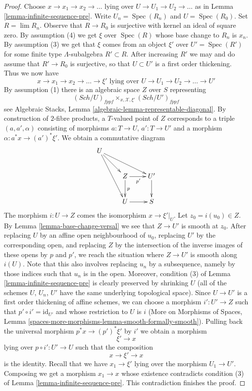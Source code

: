 \documentclass{stacks-project}
\theoremstyle{plain}
\theoremstyle{definition}
\theoremstyle{remark}
\numberwithin{equation}{subsection}
\def\lim{\mathop{\mathrm{lim}}\nolimits}
\def\Spec{\mathop{\mathrm{Spec}}}
\def\Sch{\mathit{Sch}}
\begin{document}
\begin{proof}
\medskip\noindent
Choose $x \to x_1 \to x_2 \to \ldots$ lying over
$U \to U_1 \to U_2 \to \ldots$ as in Lemma \ref{lemma-infinite-sequence-pre}.
Write $U_n = \Spec(R_n)$ and $U = \Spec(R_0)$.
Set $R = \lim R_n$. Observe that $R \to R_0$ is surjective
with kernel an ideal of square zero. By assumption (4)
we get $\xi$ over $\Spec(R)$ whose base change to $R_n$ is $x_n$.
By assumption (3) we get that $\xi$ comes from an object $\xi'$ over
$U' = \Spec(R')$ for some finite type $\Lambda$-subalgebra
$R' \subset R$. After increasing $R'$ we may and do assume that
$R' \to R_0$ is surjective, so that $U \subset U'$ is a first order thickening.
Thus we now have
$$
x \to x_1 \to x_2 \to \ldots \to \xi'
\text{ lying over }
U \to U_1 \to U_2 \to \ldots \to U'
$$
By assumption (1) there is an algebraic space $Z$ over $S$ representing
$$
(\Sch/U)_{fppf} \times_{x, \mathcal{X}, \xi'} (\Sch/U')_{fppf}
$$
see Algebraic Stacks, Lemma \ref{algebraic-lemma-representable-diagonal}.
By construction of $2$-fibre products, a $T$-valued point of $Z$
corresponds to a triple $(a, a', \alpha)$ consisting of morphisms
$a : T \to U$, $a' : T \to U'$ and a morphism $\alpha : a^*x \to (a')^*\xi'$.
We obtain a commutative diagram
$$
\xymatrix{
U \ar[rd] \ar[rdd] \ar[rrd] \\
& Z \ar[r]_{p'} \ar[d]^p & U' \ar[d] \\
& U \ar[r] & S
}
$$
The morphism $i : U \to Z$ comes the isomorphism $x \to \xi'|_U$.
Let $z_0 = i(u_0) \in Z$. By Lemma \ref{lemma-base-change-versal}
we see that $Z \to U'$ is smooth at $z_0$. After replacing $U$ by an
affine open neighbourhood of $u_0$, replacing $U'$ by the corresponding
open, and replacing $Z$ by the intersection of the inverse images
of these opens by $p$ and $p'$, we reach the situation where
$Z \to U'$ is smooth along $i(U)$. Note that this
also involves replacing $u_n$ by a subsequence, namely
by those indices such that $u_n$ is in the open. Moreover, condition
(3) of Lemma \ref{lemma-infinite-sequence-pre}
is clearly preserved by shrinking $U$
(all of the schemes $U$, $U_n$, $U'$ have the same underlying
topological space).
Since $U \to U'$ is a first order thickening of affine schemes,
we can choose a morphism $i' : U' \to Z$
such that $p' \circ i' = \text{id}_{U'}$ and
whose restriction to $U$ is $i$
(More on Morphisms of Spaces, Lemma
\ref{spaces-more-morphisms-lemma-smooth-formally-smooth}).
Pulling back the universal morphism
$p^*x \to (p')^*\xi'$ by $i'$ we obtain a morphism
$$
\xi' \to x
$$
lying over $p \circ i' : U' \to U$ such that the composition
$$
x \to \xi' \to x
$$
is the identity. Recall that we have $x_1 \to \xi'$ lying over
the morphism $U_1 \to U'$. Composing we get a morphism
$x_1 \to x$ whose existence contradicts condition
(3) of Lemma \ref{lemma-infinite-sequence-pre}.
This contradiction finishes the proof.
\end{proof}
\end{document}
